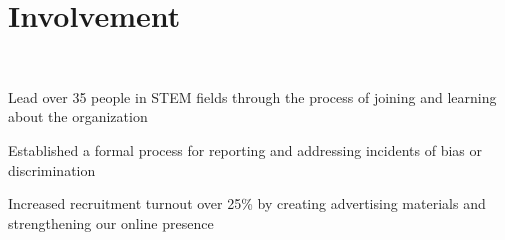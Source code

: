 \documentclass[]{hieudo-build}
\begin{document}
\begin{minipage}[t]{0.62\textwidth}


\section{Involvement}

 \\
\begin{tightemize}
\item Lead over 35 people in STEM fields through the process of joining and learning about the organization
\item Established a formal process for reporting and addressing incidents of bias or discrimination
\end{tightemize}
\begin{tightemize}
\item Increased recruitment turnout over 25\% by creating advertising materials and strengthening our online presence
\end{tightemize}
\smallsectionsep


\end{minipage}
\end{document}
